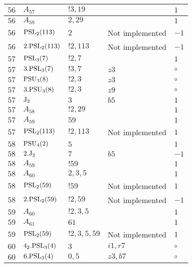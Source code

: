 \documentclass[a4paper, 11pt]{article}
\begin{document}
\begin{longtable}{lllll}
        $ 56 $ & $ A_{57} $ & $ !3, 19 $ & $ ~ $ & $ 1$ \\ \hline
        $ 56 $ & $ A_{58} $ & $ 2, 29 $ & $ ~ $ & $ 1$ \\ \hline
        $ 56 $ & $ {\rm PSL}_{2}(113) $ & $ 2 $ &  Not implemented & $ -1$ \\ \hline
        $ 56 $ & $ 2.{\rm PSL}_{2}(113) $ & $ !2, 113 $ &  Not implemented & $ -1$ \\ \hline
        $ 57 $ & $ {\rm PSL}_{3}(7) $ & $ ! 2,7 $ & $ ~ $ & $ 1$ \\ \hline
        $ 57 $ & $ 3.{\rm PSL}_{3}(7) $ & $ ! 3, 7 $ & $ z3 $ &  $\circ$ \\ \hline
        $ 57 $ & $ {\rm PSU}_{3}(8) $ & $ ! 2,3 $ & $ z3 $ &  $\circ$ \\ \hline
        $ 57 $ & $ 3.{\rm PSU}_{3}(8) $ & $ ! 2,3 $ & $ z9 $ &  $\circ$ \\ \hline
        $ 57 $ & $ {\rm J}_2 $ & $ 3 $ & $ b5 $ & $ 1$ \\ \hline
        $ 57 $ & $ A_{58} $ & $ !2, 29 $ & $ ~ $ & $ 1$ \\ \hline
        $ 57 $ & $ A_{59} $ & $ 59 $ & $ ~ $ & $ 1$ \\ \hline
        $ 57 $ & $ {\rm PSL}_{2}(113) $ & $ !2, 113 $ &  Not implemented & $ 1$ \\ \hline
        $ 58 $ & $ {\rm PSU}_{4}(2) $ & $ 5 $ & $ ~ $ & $ 1$ \\ \hline
        $ 58 $ & $ 2.{\rm J}_2 $ & $ 7 $ & $ b5 $ & $ -1$ \\ \hline
        $ 58 $ & $ A_{59} $ & $ !59 $ & $ ~ $ & $ 1$ \\ \hline
        $ 58 $ & $ A_{60} $ & $ 2, 3, 5 $ & $ ~ $ & $ 1$ \\ \hline
        $ 58 $ & $ {\rm PSL}_{2}(59) $ & $ !59 $ &  Not implemented & $ 1$ \\ \hline
        $ 58 $ & $ 2.{\rm PSL}_{2}(59) $ & $ !2, 59 $ &  Not implemented & $ -1$ \\ \hline
        $ 59 $ & $ A_{60} $ & $ !2, 3, 5 $ & $ ~ $ & $ 1$ \\ \hline
        $ 59 $ & $ A_{61} $ & $ 61 $ & $ ~ $ & $ 1$ \\ \hline
        $ 59 $ & $ {\rm PSL}_{2}(59) $ & $ !2, 3, 5, 59 $ &  Not implemented & $ 1$ \\ \hline
        $ 60 $ & $ 4_2.{\rm PSL}_{3}(4) $ & $ 3 $ & $ i1, r7 $ &  $\circ$ \\ \hline
        $ 60 $ & $ 6.{\rm PSL}_{3}(4) $ & $ 0,5 $ & $ z3, b7 $ &  $\circ$ \\ \hline

\end{longtable}
\end{document}
